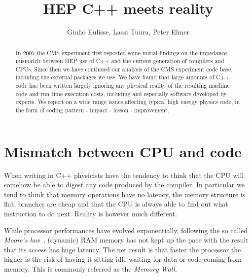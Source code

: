 \documentclass[a4paper]{jpconf}
\def\revision{}
\def\myauthor{Author}			%
\def\mytitle{Title}
\def\myauthor{Giulio Eulisse, Lassi Tuura, Peter Elmer}
\def\mytitle{HEP C++ meets reality}
\begin{document}
\title{\mytitle}
\author{\myauthor}


\setlength{\parindent}{0pt}

\ifx\mycopyright\undefined
\else
	\textcopyright{} \mycopyright
\fi

\revision

\setlength{\parindent}{1em}

%
%


\setlength{\parindent}{1em}

\begin{abstract}
\label{abstract}

In 2007 the CMS experiment first reported some initial findings on the impedance mismatch between HEP use of C++ and the current generation of compilers and CPUs. Since then we have continued our analysis of the CMS experiment code base, including the external packages we use. We have found that large amounts of C++ code has been written largely ignoring any physical reality of the resulting machine code and run time execution costs, including and especially software developed by experts. We report on a wide range issues affecting typical high energy physics code, in the form of coding pattern - impact - lesson - improvement.


\end{abstract}

\section{Mismatch between CPU and code}
\label{mismatchbetweencpuandcode}

When writing in C++ physicists have the tendency to think that the CPU will somehow be able to digest any code produced by the compiler. In particular we tend to think that memory operations have no latency, the memory structure is flat, branches are cheap and that the CPU is always able to find out what instruction to do next.
Reality is however much different.


While processor performances have evolved exponentially, following the so called {\itshape Moore's law}~\cite{Moore:1998p325}, (dynamic) RAM memory has not kept up the pace with the result that its access has huge latency. The net result is that faster the processor the higher is the risk of  having it sitting idle waiting for data or code coming from memory. This is commonly referred as the {\itshape Memory Wall}.
\end{document}
